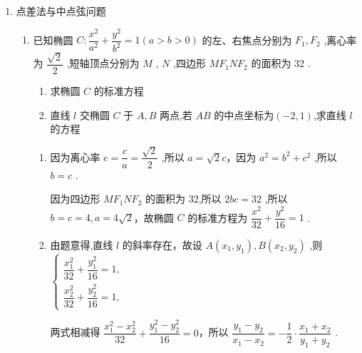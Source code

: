 \begin{enumerate}
\begin{enumerate}
\begin{jieda}
            代入第一种情况有$\left\{\begin{array}{l}
                 -\dfrac{3}{2} = -\dfrac{2a^2}{a^2+b^2} \\
                 \dfrac{1}{4} = \dfrac{a^2(1-b^2)}{a^2+b^2}
            \end{array}\right.$，解得$a^2 = 2, b^2 = \dfrac{2}{3}$，因此$\dfrac{x^2}{2}+\dfrac{3y^2}{2} = 1$
        \end{jieda}
    \end{enumerate}
    
    \item 点差法与中点弦问题
    \begin{enumerate}
        \item 已知椭圆 $C : \dfrac{{x}^{2}}{{a}^{2}} + \dfrac{{y}^{2}}{{b}^{2}} = 1\left( {a > b > 0}\right)$ 的左、右焦点分别为 ${F}_{1},{F}_{2}$ ,离心率为 $\dfrac{\sqrt{2}}{2}$ ,短轴顶点分别为 $M$ , $N$ ,四边形 $M{F}_{1}N{F}_{2}$ 的面积为 32 .
        \begin{enumerate}
            \item 求椭圆 $C$ 的标准方程
            \item 直线 $l$ 交椭圆 $C$ 于 $A,B$ 两点,若 ${AB}$ 的中点坐标为$(-2,1)$,求直线 $l$ 的方程
        \end{enumerate}
        \begin{jieda}
            \begin{enumerate}
                \item 因为离心率 $e = \dfrac{c}{a} = \dfrac{\sqrt{2}}{2}$ ,所以 $a = \sqrt{2}c$，因为 ${a}^{2} = {b}^{2} + {c}^{2}$ ,所以 $b = c$ .
                
                因为四边形 $M{F}_{1}N{F}_{2}$ 的面积为 32,所以 ${2bc} = {32}$ ,所以 $b = c = 4,a = 4\sqrt{2}$，故椭圆 $C$ 的标准方程为 $\dfrac{{x}^{2}}{32} + \dfrac{{y}^{2}}{16} = 1$ .

                \item 由题意得,直线 $l$ 的斜率存在，故设 $A\left( {{x}_{1},{y}_{1}}\right) ,B\left( {{x}_{2},{y}_{2}}\right)$ ,则 $\left\{  \begin{array}{l} \dfrac{{x}_{1}^{2}}{32} + \dfrac{{y}_{1}^{2}}{16} = 1, \\  \dfrac{{x}_{2}^{2}}{32} + \dfrac{{y}_{2}^{2}}{16} = 1, \end{array}\right.$
                
                两式相减得 $\dfrac{{x}_{1}^{2} - {x}_{2}^{2}}{32} + \dfrac{{y}_{1}^{2} - {y}_{2}^{2}}{16} = 0$，所以 $\dfrac{{y}_{1} - {y}_{2}}{{x}_{1} - {x}_{2}} =  - \dfrac{1}{2} \cdot  \dfrac{{x}_{1} + {x}_{2}}{{y}_{1} + {y}_{2}}$ .
                

\end{enumerate}
\end{jieda}
\end{enumerate}
\end{enumerate}
